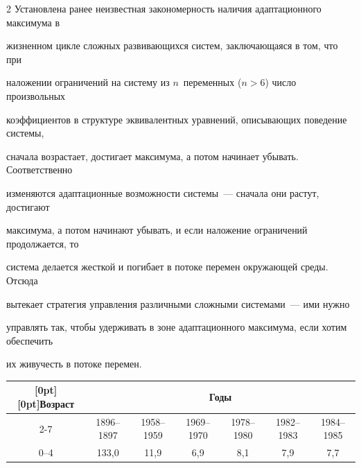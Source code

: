 \begin{multicols}{2}
      Установлена ранее неизвестная закономерность наличия адаптационного максимума в 


жизненном цикле сложных развивающихся систем, за\-клю\-ча\-ющаяся в том, что при 


наложении ограничений на сис\-те\-му из $n$~переменных ($n > 6$) чис\-ло произвольных 


коэффициентов в структуре эквивалентных уравнений, описывающих поведение сис\-те\-мы, 


сначала возрастает, достигает максимума, а потом начинает убывать. Соответственно 


изменяются адаптационные возможности сис\-те\-мы~--- сначала они растут, достигают 


максимума, а потом начинают убывать, и если наложение ограничений продолжается, то 


сис\-те\-ма делается жесткой и погибает в потоке перемен окружающей среды. Отсюда 


вытекает стратегия управ\-ле\-ния различными сложными сис\-те\-мами~--- ими нужно 


управлять так, чтобы удерживать в зоне адаптационного максимума, если хотим обеспечить 


их живучесть в потоке перемен.


      


\begin{table}\small


\begin{center}




\vspace*{2ex}





\begin{tabular}{|c|c|c|c|c|c|c|}


\hline


\multicolumn{1}{|c|}{\raisebox{-4pt}[0pt][0pt]{Возраст}}& \multicolumn{6}{c|}{Годы}\\


\cline{2-7}





&1896--1897&1958--1959&1969--1970&1978--1980&1982--1983&1984--1985\\


\hline


0--4&133,0\hphantom{99}&11,9&6,9&8,1&7,9&7,7\\



\end{tabular}
\end{center}
\end{table}
\end{multicols}
